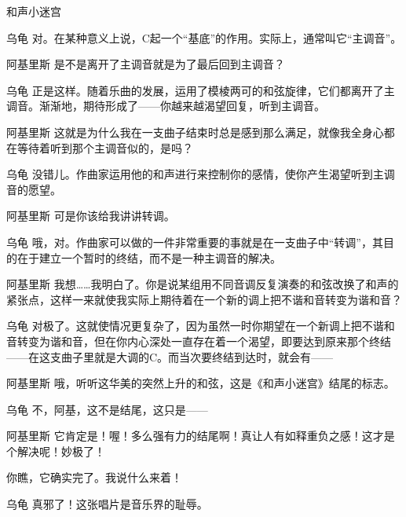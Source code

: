 \begin{dialog}{和声小迷宫}
\begin{dialogue}
\begin{dialogue}
\begin{dialogue}
\begin{dialogue}
      \item[乌龟]对。在某种意义上说，C起一个“基底”的作用。实际上，通常叫它“主调音”。

      \item[阿基里斯]是不是离开了主调音就是为了最后回到主调音？

      \item[乌龟]正是这样。随着乐曲的发展，运用了模棱两可的和弦旋律，它们都离开了主调音。渐渐地，期待形成了——你越来越渴望回复，听到主调音。

      \item[阿基里斯]这就是为什么我在一支曲子结束时总是感到那么满足，就像我全身心都在等待着听到那个主调音似的，是吗？

      \item[乌龟]没错儿。作曲家运用他的和声进行来控制你的感情，使你产生渴望听到主调音的愿望。

      \item[阿基里斯]可是你该给我讲讲转调。

      \item[乌龟]哦，对。作曲家可以做的一件非常重要的事就是在一支曲子中“转调”，其目的在于建立一个暂时的终结，而不是一种主调音的解决。

      \item[阿基里斯]我想……我明白了。你是说某组用不同音调反复演奏的和弦改换了和声的紧张点，这样一来就使我实际上期待着在一个新的调上把不谐和音转变为谐和音？

      \item[乌龟]对极了。这就使情况更复杂了，因为虽然一时你期望在一个新调上把不谐和音转变为谐和音，但在你内心深处一直存在着一个渴望，即要达到原来那个终结——在这支曲子里就是大调的C。而当次要终结到达时，就会有——

      \item[阿基里斯\dlnote{（突然热情地打着手势）}]哦，听听这华美的突然上升的和弦，这是《和声小迷宫》结尾的标志。

      \item[乌龟]不，阿基，这不是结尾，这只是——

      \item[阿基里斯]它肯定是！喔！多么强有力的结尾啊！真让人有如释重负之感！这才是个解决呢！妙极了！


      你瞧，它确实完了。我说什么来着！

      \item[乌龟]真邪了！这张唱片是音乐界的耻辱。


\end{dialogue}
\end{dialogue}
\end{dialogue}
\end{dialogue}
\end{dialog}
